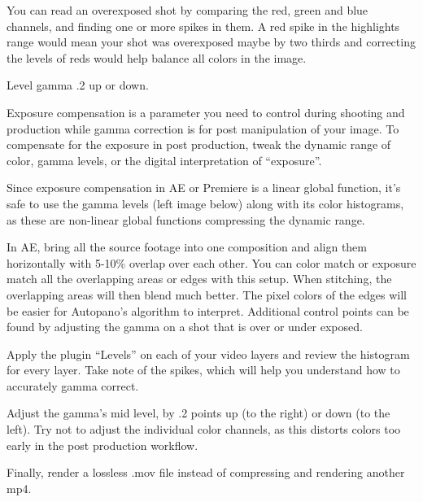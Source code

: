 \begin{fullwidth}
You can read an overexposed shot by comparing the red, green and blue channels, and finding one or more spikes in them. A red spike in the highlights range would mean your shot was overexposed maybe by two thirds and correcting the levels of reds would help balance all colors in the image.

{\large Level gamma .2 up or down. \par}

Exposure compensation is a parameter you need to control during shooting and production while gamma correction is for post manipulation of your image. To compensate for the exposure in post production, tweak the dynamic range of color, gamma levels, or the digital interpretation of “exposure”. 

Since exposure compensation in AE or Premiere is a linear global function, it’s safe to use the gamma levels (left image below) along with its color histograms, as these are non-linear global functions compressing the dynamic range. 


In AE, bring all the source footage into one composition and align them horizontally with 5-10\% overlap over each other. You can color match or exposure match all the overlapping areas or edges with this setup. When stitching, the overlapping areas will then blend much better. The pixel colors of the edges will be easier for Autopano’s algorithm to interpret. Additional control points can be found by adjusting the gamma on a shot that is over or under exposed.


Apply the plugin “Levels” on each of your video layers and review the histogram for every layer. Take note of the spikes, which will help you understand how to accurately gamma correct.


Adjust the gamma’s mid level, by .2 points up (to the right) or down (to the left). Try not to adjust the individual color channels, as this distorts colors too early in the post production workflow.


Finally, render a lossless .mov file instead of compressing and rendering another mp4.


\clearpage
\end{fullwidth}